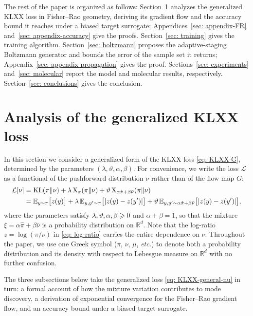 \documentclass{article}
\begin{document}
The rest of the paper is organized as follows:
Section~\ref{sec: FR} analyzes the generalized KLXX loss in Fisher--Rao geometry, deriving its gradient flow and the accuracy bound it reaches under a biased target surrogate; Appendices~\ref{sec: appendix-FR} and~\ref{sec: appendix-accuracy} give the proofs. Section~\ref{sec: training} gives the training algorithm. Section~\ref{sec: boltzmann} proposes the adaptive-staging Boltzmann generator and bounds the error of the sample set it returns; Appendix~\ref{sec: appendix-propagation} gives the proof. Sections~\ref{sec: experiments} and~\ref{sec: molecular} report the model and molecular results, respectively.  Section~\ref{sec: conclusions} gives the conclusion.

\section{Analysis of the generalized KLXX loss}
\label{sec: FR}

In this section we consider a generalized form of the KLXX loss \eqref{eq: KLXX-G}, determined by the parameters $(\lambda,\vartheta,\alpha,\beta)$. For convenience, we write the loss $\mathcal L$ as a functional of the pushforward distribution $\nu$ rather than of the flow map $G$:
\begin{align}
	\mathcal L[\nu] & =  \mathrm{KL}(\pi\|\nu) + \lambda\,\mathrm{X}_\pi(\pi\|\nu) + \vartheta\,\mathrm{X}_{\alpha\hat\pi+\beta\bar\nu}(\pi\|\nu) \notag \\
	& = \mathbb E_{y\sim\pi}\big[z(y)\big] +  \lambda\, \mathbb E_{y,y'\sim\pi}\big[|z(y)-z(y')|\big] + \vartheta\, \mathbb E_{y,y'\sim \alpha\hat\pi+\beta\bar\nu}\big[|z(y)-z(y')|\big],
	\label{eq: KLXX-general-nu}
\end{align}
where the parameters satisfy $\lambda,\vartheta,\alpha,\beta\geqslant0$ and $\alpha+\beta=1$, so that the mixture $\xi = \alpha\hat\pi+\beta\bar\nu$ is a probability distribution on $\mathbb R^d$. Note that the log-ratio $z = \log(\pi/\nu)$ in \eqref{eq: log-ratio} carries the entire dependence on $\nu$. Throughout the paper, we use one Greek symbol ($\pi$, $\nu$, $\mu$, \emph{etc.}) to denote both a probability distribution and its density with respect to Lebesgue measure on $\mathbb R^d$ with no further confusion.

The three subsections below take the generalized loss \eqref{eq: KLXX-general-nu} in turn: a formal account of how the mixture variation contributes to mode discovery, a derivation of exponential convergence for the Fisher--Rao gradient flow, and an accuracy bound under a biased target surrogate.
\end{document}
